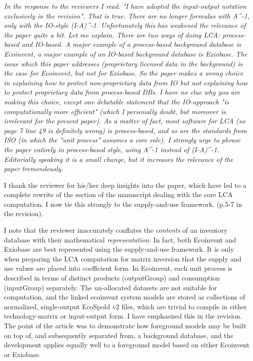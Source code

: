 \documentclass[11pt,letterpaper]{article}
\begin{document}
\emph{In the response to the reviewers I read: "I have adopted the input-output notation exclusively in the revision". That is true. There are no longer formulas with A\^{}-1, only with the IO-style (I-A)\^{}-1. Unfortunately this has weakened the relevance of the paper quite a bit. Let me explain. There are two ways of doing LCA: process-based and IO-based.  A major example of a process-based background database is Ecoinvent, a major example of an IO-based background database is Exiobase. The issue which this paper addresses (proprietary licensed data in the background) is the case for Ecoinvent, but not for Exiobase. So the paper makes a wrong choice in explaining how to protect non-proprietary data from IO but not explaining how to protect proprietary data from process-based DBs. I have no clue why you are making this choice, except one debatable statement that the IO-approach "is computationally more efficient" (which I personally doubt, but moreover is irrelevant for the present paper). As a matter of fact, most software for LCA (so page 7 line 49 is definitely wrong) is process-based, and so are the standards from ISO (in which the "unit process" assumes a core role). I strongly urge to phrase the paper entirely in process-based style, using A\^{}-1 instead of (I-A)\^{}-1. Editorially speaking it is a small change, but it increases the relevance of the paper tremendously.}

I thank the reviewer for his/her deep insights into the paper, which have led to a complete rewrite of the section of the manuscript dealing with the core LCA computation.  I now tie this strongly to the supply-and-use framework. (p.5-7 in the revision).

I note that the reviewer inaccurately conflates the \textit{contents} of an inventory database with their mathematical \textit{representation.}  In fact, both Ecoinvent and Exiobase are best represented using the supply-and-use framework.  It is only when preparing the LCA computation for matrix inversion that the supply and use values are placed into coefficient form.  In Ecoinvent, each unit process is described in terms of distinct products (outputGroup) and consumption (inputGroup) separately.  The un-allocated datasets are not suitable for computation, and the linked ecoinvent system models are stored as collections of normalized, single-output EcoSpold v2 files, which are trivial to compile in either technology-matrix or input-output form.  I have emphasized this in the revision.  The point of the article was to demonstrate how foreground models may be built on top of, and subsequently separated from, a background database, and the development applies equally well to a foreground model based on either Ecoinvent or Exiobase.  
\end{document}
